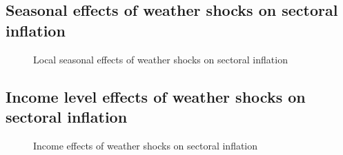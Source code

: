 \documentclass[
  letterpaper,
  DIV=11,
  numbers=noendperiod]{scrartcl}
\begin{document}
\subsection{Seasonal effects of weather shocks on sectoral
inflation}\label{seasonal-effects-of-weather-shocks-on-sectoral-inflation}

\begin{figure}[H]


\caption{\label{fig-seasonal_direct}Local seasonal effects of weather
shocks on sectoral inflation}

\end{figure}%

\subsection{Income level effects of weather shocks on sectoral
inflation}\label{income-level-effects-of-weather-shocks-on-sectoral-inflation}

\begin{figure}[H]


\caption{\label{fig-income_direct}Income effects of weather shocks on
sectoral inflation}

\end{figure}%
\end{document}
